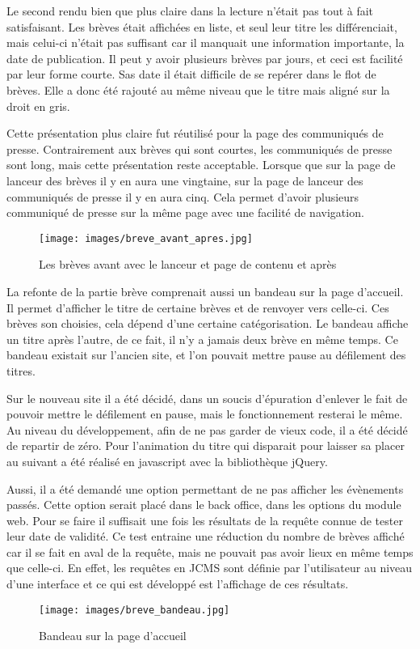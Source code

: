 \documentclass[12pt,a4paper]{article}
\begin{document}
\medskip
Le second rendu bien que plus claire dans la lecture n'était pas tout à fait satisfaisant. Les brèves était affichées en liste, et seul leur titre les différenciait, mais celui-ci n'était pas suffisant car il manquait une information importante, la date de publication. Il peut y avoir plusieurs brèves par jours, et ceci est facilité par leur forme courte. Sas date il était difficile de se repérer dans le flot de brèves. Elle a donc été rajouté au même niveau que le titre mais aligné sur la droit en gris.\par
\medskip
Cette présentation plus claire fut réutilisé pour la page des communiqués de presse. Contrairement aux brèves qui sont courtes, les communiqués de presse sont long, mais cette présentation reste acceptable. Lorsque que sur la page de lanceur des brèves il y en aura une vingtaine, sur la page de lanceur des communiqués de presse il y en aura cinq. Cela permet d'avoir plusieurs communiqué de presse sur la même page avec une facilité de navigation.\par
\begin{figure}[h!]
\centering\texttt{[image: images/breve\_avant\_apres.jpg]} 
\caption{Les brèves avant avec le lanceur et page de contenu et après}
\end{figure}
\bigskip 
La refonte de la partie brève comprenait aussi un bandeau sur la page d'accueil. Il permet d'afficher le titre de certaine brèves et de renvoyer vers celle-ci. Ces brèves son choisies, cela dépend d'une certaine catégorisation. Le bandeau affiche un titre après l'autre, de ce fait, il n'y a jamais deux brève en même temps. Ce bandeau existait sur l'ancien site, et l'on pouvait mettre pause au défilement des titres.\par 
Sur le nouveau site il a été décidé, dans un soucis d'épuration d'enlever le fait de pouvoir mettre le défilement en pause, mais le fonctionnement resterai le même. Au niveau du développement, afin de ne pas garder de vieux code, il a été décidé de repartir de zéro. Pour l'animation du titre qui disparait pour laisser sa placer au suivant a été réalisé en javascript avec la bibliothèque jQuery.\par 
Aussi, il a été demandé une option permettant de ne pas afficher les évènements passés. Cette option serait placé dans le back office, dans les options du module web. Pour se faire il suffisait une fois les résultats de la requête connue de tester leur date de validité. Ce test entraine une réduction du nombre de brèves affiché car il se fait en aval de la requête, mais ne pouvait pas avoir lieux en même temps que celle-ci. En effet, les requêtes en \gls{JCMS} sont définie par l'utilisateur au niveau d'une interface et ce qui est développé est l'affichage de ces résultats.\par
\begin{figure}[h!]
\centering\texttt{[image: images/breve\_bandeau.jpg]} 
\caption{Bandeau sur la page d'accueil}
\end{figure}
\end{document}
